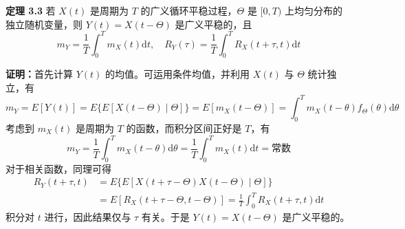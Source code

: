 \documentclass[11pt,openany,UTF8]{ctexbook}
\newcommand{\dif}{\mathrm{d}}                      %
\newcommand{\E}{E}                                 %
\newcommand{\thm}[1]{\par\medskip\noindent\textbf{#1}\quad}
\begin{document}
\thm{定理 3.3} 若 $X(t)$ 是周期为 $T$ 的广义循环平稳过程\nobreak，$\Theta$ 是 $[0,T)$ 上均匀分布的独立随机变量\nobreak，则 $Y(t)=X(t-\Theta)$ 是广义平稳的\nobreak，且
\begin{equation}
m_Y=\frac{1}{T}\int_0^T m_X(t)\dif t,\quad R_Y(\tau)=\frac{1}{T}\int_0^T R_X(t+\tau,t)\dif t
\label{eq:3.8}
\end{equation}

\textbf{证明\nobreak：}首先计算 $Y(t)$ 的均值\nobreak。可运用条件均值\nobreak，并利用 $X(t)$ 与 $\Theta$ 统计独立\nobreak，有
\[
m_Y=\E[Y(t)]=\E\{\E[X(t-\Theta)\mid\Theta]\}=\E[m_X(t-\Theta)]=\int_0^T m_X(t-\theta)f_\Theta(\theta)\dif\theta
\]
考虑到 $m_X(t)$ 是周期为 $T$ 的函数\nobreak，而积分区间正好是 $T$\nobreak，有
\[
m_Y=\frac{1}{T}\int_0^T m_X(t-\theta)\dif\theta=\frac{1}{T}\int_0^T m_X(t)\dif t=\text{常数}
\]
对于相关函数\nobreak，同理可得
\[
\begin{aligned}
R_Y(t+\tau,t)&=\E\{\E[X(t+\tau-\Theta)X(t-\Theta)\mid\Theta]\}\\
&=\E[R_X(t+\tau-\Theta,t-\Theta)]=\frac{1}{T}\int_0^T R_X(t+\tau,t)\dif t
\end{aligned}
\]
积分对 $t$ 进行\nobreak，因此结果仅与 $\tau$ 有关\nobreak。于是 $Y(t)=X(t-\Theta)$ 是广义平稳的\nobreak。
\end{document}
